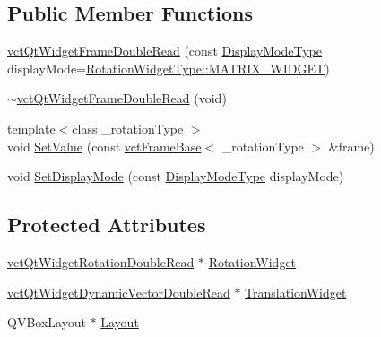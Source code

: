 \subsection*{Public Member Functions}
\begin{DoxyCompactItemize}
\item 
\hyperlink{classvct_qt_widget_frame_double_read_a924d392fbb54088961946d42f4da3a33}{vct\-Qt\-Widget\-Frame\-Double\-Read} (const \hyperlink{classvct_qt_widget_rotation_double_read_a77ae5a0ee5fe231ad2f9dd020aad434c}{Display\-Mode\-Type} display\-Mode=\hyperlink{classvct_qt_widget_rotation_double_read_a77ae5a0ee5fe231ad2f9dd020aad434cab4e7af571815b292da348c3526627d1e}{Rotation\-Widget\-Type\-::\-M\-A\-T\-R\-I\-X\-\_\-\-W\-I\-D\-G\-E\-T})
\item 
\hyperlink{classvct_qt_widget_frame_double_read_a787ed1ae3145a669a88b1bf8f10acb60}{$\sim$vct\-Qt\-Widget\-Frame\-Double\-Read} (void)
\item 
{\footnotesize template$<$class \-\_\-rotation\-Type $>$ }\\void \hyperlink{classvct_qt_widget_frame_double_read_a6bc1671d1d18c319dbf26457aae9a783}{Set\-Value} (const \hyperlink{classvct_frame_base}{vct\-Frame\-Base}$<$ \-\_\-rotation\-Type $>$ \&frame)
\item 
void \hyperlink{classvct_qt_widget_frame_double_read_a55e420ec71d99dd8a7b8cdd05e408740}{Set\-Display\-Mode} (const \hyperlink{classvct_qt_widget_rotation_double_read_a77ae5a0ee5fe231ad2f9dd020aad434c}{Display\-Mode\-Type} display\-Mode)
\end{DoxyCompactItemize}
\subsection*{Protected Attributes}
\begin{DoxyCompactItemize}
\item 
\hyperlink{classvct_qt_widget_rotation_double_read}{vct\-Qt\-Widget\-Rotation\-Double\-Read} $\ast$ \hyperlink{classvct_qt_widget_frame_double_read_a7044426a9061234c402ba1ce2f64113d}{Rotation\-Widget}
\item 
\hyperlink{vct_qt_forward_declarations_8h_a6cbce1b6d338096215fc40cb0fdfb848}{vct\-Qt\-Widget\-Dynamic\-Vector\-Double\-Read} $\ast$ \hyperlink{classvct_qt_widget_frame_double_read_a2795e93ee9010d34c7e5af32f555ecdd}{Translation\-Widget}
\item 
Q\-V\-Box\-Layout $\ast$ \hyperlink{classvct_qt_widget_frame_double_read_a084b914e4eb2577cb495d249b441694e}{Layout}
\end{DoxyCompactItemize}


